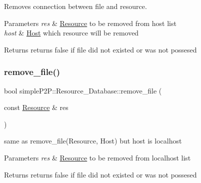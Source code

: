 Removes connection between file and resource. 


\begin{DoxyParams}{Parameters}
{\em res} & \hyperlink{classsimpleP2P_1_1Resource}{Resource} to be removed from host list \\
\hline
{\em host} & \hyperlink{classsimpleP2P_1_1Host}{Host} which resource will be removed \\
\hline
\end{DoxyParams}
\begin{DoxyReturn}{Returns}
returns false if file did not existed or was not possesed 
\end{DoxyReturn}
\mbox{\label{classsimpleP2P_1_1Resource__Database_aa7e7b4575b8217dc3e52fb741ff0474a}} 
\subsubsection{\texorpdfstring{remove\+\_\+file()}{remove\_file()}\hspace{0.1cm}{\footnotesize\ttfamily [2/2]}}
{\footnotesize\ttfamily bool simple\+P2\+P\+::\+Resource\+\_\+\+Database\+::remove\+\_\+file (\begin{DoxyParamCaption}\item[{const \hyperlink{classsimpleP2P_1_1Resource}{Resource} \&}]{res }\end{DoxyParamCaption})}



same as remove\+\_\+file(\+Resource, Host) but host is localhost 


\begin{DoxyParams}{Parameters}
{\em res} & \hyperlink{classsimpleP2P_1_1Resource}{Resource} to be removed from localhost list \\
\hline
\end{DoxyParams}
\begin{DoxyReturn}{Returns}
returns false if file did not existed or was not possesed 
\end{DoxyReturn}
\mbox{\label{classsimpleP2P_1_1Resource__Database_a7ea91d496814c3d911b14ef4cd863943}} 
